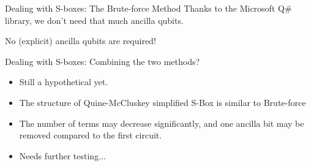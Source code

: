 \documentclass{beamer}
\begin{document}
    \begin{frame}{Dealing with S-boxes: The Brute-force Method}
    Thanks to the Microsoft Q\# library, we don't need that much ancilla qubits.
    \begin{center}
    \end{center}
    No (explicit) ancilla qubits are required!
    \end{frame}

    \begin{frame}{Dealing with S-boxes: Combining the two methods?}
        \begin{itemize}
            \item Still a hypothetical yet.
            \item The structure of Quine-McCluskey simplified S-Box is similar to Brute-force
            \item The number of terms may decrease significantly, and one ancilla bit may be removed compared to the first circuit.
            \item Needs further testing...
        \end{itemize}
    \end{frame}
\end{document}
